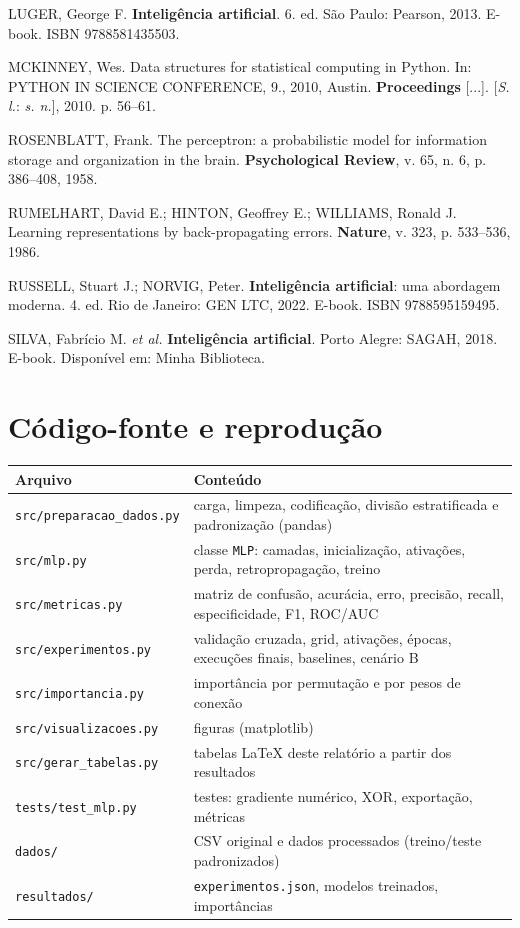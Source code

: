 \documentclass[11pt,a4paper]{article}
\begin{document}
LUGER, George F. \textbf{Inteligência artificial}. 6. ed. São Paulo: Pearson, 2013. E-book.
ISBN 9788581435503.

MCKINNEY, Wes. Data structures for statistical computing in Python. In: PYTHON IN SCIENCE CONFERENCE, 9.,
2010, Austin. \textbf{Proceedings} [...]. [\emph{S. l.}: \emph{s. n.}], 2010. p. 56--61.

ROSENBLATT, Frank. The perceptron: a probabilistic model for information storage and organization in the
brain. \textbf{Psychological Review}, v. 65, n. 6, p. 386--408, 1958.

RUMELHART, David E.; HINTON, Geoffrey E.; WILLIAMS, Ronald J. Learning representations by
back-propagating errors. \textbf{Nature}, v. 323, p. 533--536, 1986.

RUSSELL, Stuart J.; NORVIG, Peter. \textbf{Inteligência artificial}: uma abordagem moderna. 4. ed.
Rio de Janeiro: GEN LTC, 2022. E-book. ISBN 9788595159495.

SILVA, Fabrício M. \emph{et al.} \textbf{Inteligência artificial}. Porto Alegre: SAGAH, 2018. E-book.
Disponível em: Minha Biblioteca.
\endgroup

\appendix
\section{Código-fonte e reprodução}\label{apx:codigo}
\begin{center}\footnotesize
\begin{tabular}{lp{10.2cm}}\toprule
Arquivo & Conteúdo\\\midrule
\texttt{src/preparacao\_dados.py} & carga, limpeza, codificação, divisão estratificada e padronização (pandas)\\
\texttt{src/mlp.py} & classe \texttt{MLP}: camadas, inicialização, ativações, perda, retropropagação, treino\\
\texttt{src/metricas.py} & matriz de confusão, acurácia, erro, precisão, recall, especificidade, F1, ROC/AUC\\
\texttt{src/experimentos.py} & validação cruzada, grid, ativações, épocas, execuções finais, baselines, cenário B\\
\texttt{src/importancia.py} & importância por permutação e por pesos de conexão\\
\texttt{src/visualizacoes.py} & figuras (matplotlib)\\
\texttt{src/gerar\_tabelas.py} & tabelas LaTeX deste relatório a partir dos resultados\\
\texttt{tests/test\_mlp.py} & testes: gradiente numérico, XOR, exportação, métricas\\
\texttt{dados/} & CSV original e dados processados (treino/teste padronizados)\\
\texttt{resultados/} & \texttt{experimentos.json}, modelos treinados, importâncias\\
\bottomrule\end{tabular}
\end{center}
\end{document}
